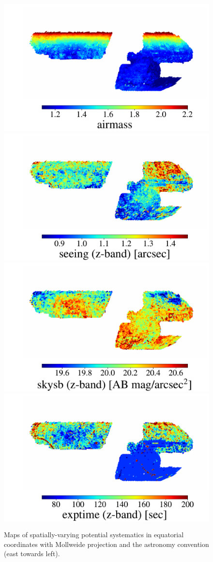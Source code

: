 \documentclass[a4paper,usenatbib]{mnras}
\begin{document}
\begin{figure}
\includegraphics[width=0.24\linewidth, trim={1.5cm 0 1.2cm 1.5cm},clip]{figures/systematic_maps/airmass.pdf}
\includegraphics[width=0.24\linewidth, trim={1.5cm 0 1.2cm 1.5cm},clip]{figures/systematic_maps/seeing_z.pdf}
\includegraphics[width=0.24\linewidth, trim={1.5cm 0 1.2cm 1.5cm},clip]{figures/systematic_maps/skymag_z.pdf}
\includegraphics[width=0.24\linewidth, trim={1.5cm 0 1.2cm 1.5cm},clip]{figures/systematic_maps/exptime_z.pdf}
\caption{Maps of spatially-varying potential systematics in equatorial coordinates with Mollweide projection and the astronomy convention (east towards left).}
\label{fig:systematic_maps}
\end{figure}
\end{document}
